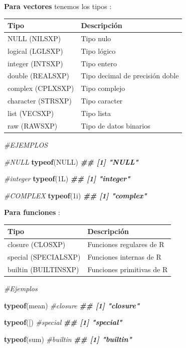 \documentclass[
]{book}
\newenvironment{Shaded}{\begin{snugshade}}{\end{snugshade}}
\newcommand{\AttributeTok}[1]{\textcolor[rgb]{0.13,0.29,0.53}{#1}}
\newcommand{\CommentTok}[1]{\textcolor[rgb]{0.56,0.35,0.01}{\textit{#1}}}
\newcommand{\ConstantTok}[1]{\textcolor[rgb]{0.56,0.35,0.01}{#1}}
\newcommand{\DocumentationTok}[1]{\textcolor[rgb]{0.56,0.35,0.01}{\textbf{\textit{#1}}}}
\newcommand{\FunctionTok}[1]{\textcolor[rgb]{0.13,0.29,0.53}{\textbf{#1}}}
\newcommand{\NormalTok}[1]{#1}
\newcommand{\StringTok}[1]{\textcolor[rgb]{0.31,0.60,0.02}{#1}}
\begin{document}
\textbf{Para vectores} tenemos los tipos :

\begin{longtable}[]{@{}ll@{}}
\toprule\noalign{}
Tipo & Descripción \\
\midrule\noalign{}
\endhead
\bottomrule\noalign{}
\endlastfoot
NULL (NILSXP) & Tipo nulo \\
logical (LGLSXP) & Tipo lógico \\
integer (INTSXP) & Tipo entero \\
double (REALSXP) & Tipo decimal de precisión doble \\
complex (CPLXSXP) & Tipo complejo \\
character (STRSXP) & Tipo caracter \\
list (VECSXP) & Tipo lista \\
raw (RAWSXP) & Tipo de datos binarios \\
\end{longtable}

\begin{Shaded}
\begin{Highlighting}[]
\CommentTok{\#EJEMPLOS}

\CommentTok{\#NULL}
\FunctionTok{typeof}\NormalTok{(}\ConstantTok{NULL}\NormalTok{)}
\DocumentationTok{\#\# [1] "NULL"}


\CommentTok{\#integer}
\FunctionTok{typeof}\NormalTok{(1L)}
\DocumentationTok{\#\# [1] "integer"}


\CommentTok{\#COMPLEX}
\FunctionTok{typeof}\NormalTok{(1i)}
\DocumentationTok{\#\# [1] "complex"}
\end{Highlighting}
\end{Shaded}

\textbf{Para funciones} :

\begin{longtable}[]{@{}ll@{}}
\toprule\noalign{}
Tipo & Descripción \\
\midrule\noalign{}
\endhead
\bottomrule\noalign{}
\endlastfoot
closure (CLOSXP) & Funciones regulares de R \\
special (SPECIALSXP) & Funciones internas de R \\
builtin (BUILTINSXP) & Funciones primitivas de R \\
\end{longtable}

\begin{Shaded}
\begin{Highlighting}[]
\CommentTok{\#Ejemplos}

\FunctionTok{typeof}\NormalTok{(mean) }\CommentTok{\#closure}
\DocumentationTok{\#\# [1] "closure"}

\FunctionTok{typeof}\NormalTok{(}\StringTok{\textasciigrave{}}\AttributeTok{[}\StringTok{\textasciigrave{}}\NormalTok{) }\CommentTok{\#special}
\DocumentationTok{\#\# [1] "special"}

\FunctionTok{typeof}\NormalTok{(sum) }\CommentTok{\#builtin}
\DocumentationTok{\#\# [1] "builtin"}
\end{Highlighting}
\end{Shaded}
\end{document}
